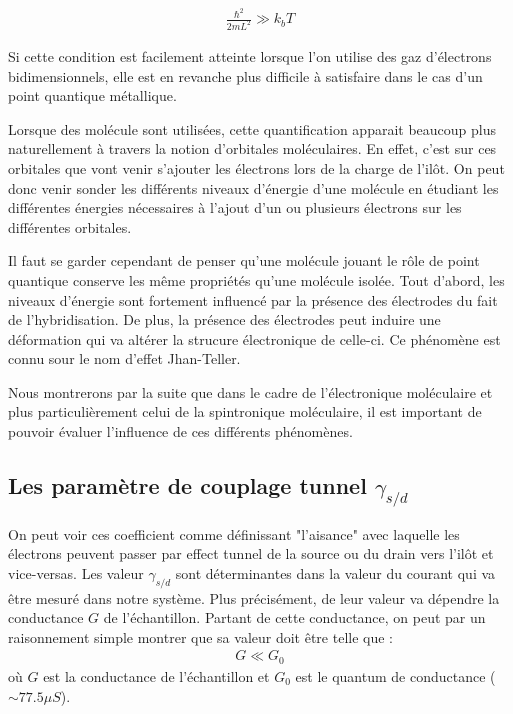 \begin{eqnarray}
\frac{\hbar^2}{2mL^2} \gg k_bT \nonumber
\end{eqnarray}

Si cette condition est facilement atteinte lorsque l'on utilise des gaz d'électrons bidimensionnels, elle est en revanche plus difficile à satisfaire dans le cas d'un point quantique métallique. \newline


Lorsque des molécule sont utilisées, cette quantification apparait beaucoup plus naturellement à travers la notion d'orbitales moléculaires. En effet, c'est sur ces orbitales que vont venir s'ajouter les électrons lors de la charge de l'il\^ot. On peut donc venir sonder les différents niveaux d'énergie d'une molécule en étudiant les différentes énergies nécessaires à l'ajout d'un ou plusieurs électrons sur les différentes orbitales. 

Il faut se garder cependant de penser qu'une molécule jouant le r\^ole de point quantique conserve les m\^eme propriétés qu'une molécule isolée. Tout d'abord, les niveaux d'énergie sont fortement influencé par la présence des électrodes du fait de l'hybridisation. De plus, la présence des électrodes peut induire une déformation qui va altérer la strucure électronique de celle-ci. Ce phénomène est connu sour le nom d'effet Jhan-Teller. 

Nous montrerons par la suite que dans le cadre de l'électronique moléculaire et plus particulièrement celui de la spintronique moléculaire, il est important de pouvoir évaluer l'influence de ces différents phénomènes.

\subsection{Les paramètre de couplage tunnel $\gamma_{s/d}$}
On peut voir ces coefficient comme définissant "l'aisance" avec laquelle les électrons peuvent passer par effect tunnel de la source ou du drain vers l'il\^ot et vice-versas. Les valeur $\gamma_{s/d}$ sont déterminantes dans la valeur du courant qui va \^etre mesuré dans notre système. Plus précisément, de leur valeur va dépendre la conductance $G$ de l'échantillon. Partant de cette conductance, on peut par un raisonnement simple montrer que sa valeur doit \^etre telle que :
\begin{eqnarray}
G \ll G_0
\end{eqnarray}
où $G$ est la conductance de l'échantillon et $G_0$ est le quantum de conductance ($\sim 77.5 \mu S$).


